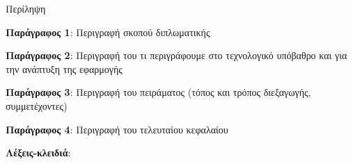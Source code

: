 \pagestyle{plain}
\begin{center}
{\LARGE Περίληψη}\\[1cm]
\end{center}

\setlength{\parindent}{0pt}
\textbf{Παράγραφος 1}: Περιγραφή σκοπού διπλωματικής

\textbf{Παράγραφος 2}: Περιγραφή του τι περιγράφουμε στο τεχνολογικό υπόβαθρο και για
την ανάπτυξη της εφαρμογής

\textbf{Παράγραφος 3}: Περιγραφή του πειράματος (τόπος και τρόπος διεξαγωγής, συμμετέχοντες)

\textbf{Παράγραφος 4}: Περιγραφή του τελευταίου κεφαλαίου

\textbf{Λέξεις-κλειδιά}: {\keywords}
